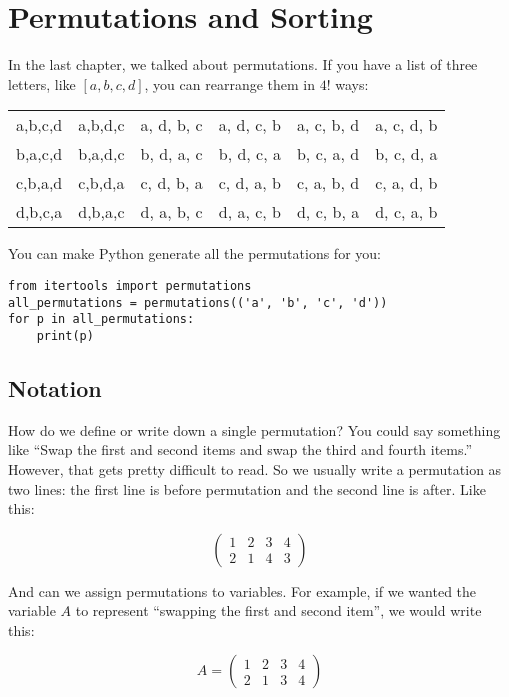 \chapter{Permutations and Sorting}

In the last chapter, we talked about permutations. If you have a list
of three letters, like $[a, b, c, d]$, you can rearrange them in $4!$
ways:

\begin{tabular}{c c c c c c}
  a,b,c,d & a,b,d,c & a, d, b, c & a, d, c, b & a, c, b, d & a, c, d, b \\
  b,a,c,d & b,a,d,c & b, d, a, c & b, d, c, a & b, c, a, d & b, c, d, a \\
  c,b,a,d & c,b,d,a & c, d, b, a & c, d, a, b & c, a, b, d & c, a, d, b \\
  d,b,c,a & d,b,a,c & d, a, b, c & d, a, c, b & d, c, b, a & d, c, a, b
\end{tabular}

You can make Python generate all the permutations for you:

\begin{Verbatim}
from itertools import permutations
all_permutations = permutations(('a', 'b', 'c', 'd'))
for p in all_permutations:
    print(p)
\end{Verbatim}

\section{Notation}

How do we define or write down a single permutation? You could say
something like ``Swap the first and second items and swap the third
and fourth items.'' However, that gets pretty difficult to read. So we
usually write a permutation as two lines: the first line is before
permutation and the second line is after.  Like this:

$$\begin{pmatrix}
  1 & 2 & 3 & 4 \\
  2 & 1 & 4 & 3
\end{pmatrix}$$

And can we assign permutations to variables. For example, if we wanted the
variable $A$ to represent ``swapping the first and second item'', we
would write this:

$$A = \begin{pmatrix}
  1 & 2 & 3 & 4 \\
  2 & 1 & 3 & 4
\end{pmatrix}$$

